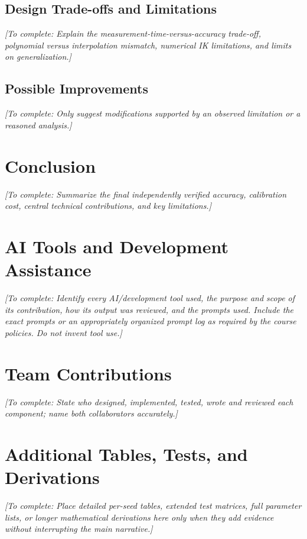 \documentclass[11pt,letterpaper]{article}
\newcommand{\placeholder}[1]{{\color{placeholdergray}\itshape [To complete: #1]}}
\begin{document}
\subsection{Design Trade-offs and Limitations}
\placeholder{Explain the measurement-time-versus-accuracy trade-off, polynomial versus interpolation mismatch, numerical IK limitations, and limits on generalization.}
\subsection{Possible Improvements}
\placeholder{Only suggest modifications supported by an observed limitation or a reasoned analysis.}

\section{Conclusion}\label{sec:conclusion}
\placeholder{Summarize the final independently verified accuracy, calibration cost, central technical contributions, and key limitations.}

\clearpage
\printbibliography[heading=bibintoc,title={References}]

\appendix
\section{AI Tools and Development Assistance}\label{app:ai}
\placeholder{Identify every AI/development tool used, the purpose and scope of its contribution, how its output was reviewed, and the prompts used. Include the exact prompts or an appropriately organized prompt log as required by the course policies. Do not invent tool use.}

\section{Team Contributions}\label{app:team}
\placeholder{State who designed, implemented, tested, wrote and reviewed each component; name both collaborators accurately.}

\section{Additional Tables, Tests, and Derivations}\label{app:additional}
\placeholder{Place detailed per-seed tables, extended test matrices, full parameter lists, or longer mathematical derivations here only when they add evidence without interrupting the main narrative.}
\end{document}

